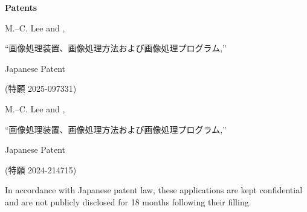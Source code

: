\documentclass[a4paper,9pt]{extarticle}
\begin{document}
\noindent
\textbf{Patents}
\begin{enumerate}[label={[\arabic*]}, start=1]
    \item 
    M.--C. Lee and ,
    \begin{CJK}{UTF8}{min}``画像処理装置、画像処理方法および画像処理プログラム,''\end{CJK} 
    Japanese Patent \begin{CJK}{UTF8}{min}(特願 2025-097331)\end{CJK}
    \item 
    M.--C. Lee and ,
    \begin{CJK}{UTF8}{min}``画像処理装置、画像処理方法および画像処理プログラム,''\end{CJK} 
    Japanese Patent \begin{CJK}{UTF8}{min}(特願 2024-214715)\end{CJK}
    
    \item[*] In accordance with Japanese patent law, these applications are kept confidential and are not publicly disclosed
    for 18 months following their filling.

\end{enumerate} 



\end{document}
